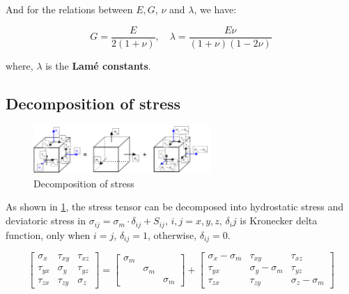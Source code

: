 \documentclass[en,hazy,cyan,8pt,normal]{elegantnote}
\numberwithin{equation}{section}
\begin{document}
    And for the relations between $E, G$, $\nu$ and $\lambda$, we have:

    \begin{equation}\label{eq:063}
      G = \frac{E}{2(1+\nu)}, \quad \lambda = \frac{E\nu}{(1+\nu)(1-2\nu)}
    \end{equation}

    where, $\lambda$ is the \textbf{Lamé constants}.

  \subsection{Decomposition of stress}\label{subsec:03.05}
    
    \begin{figure}[H]
      \centering
      \includegraphics[width=0.6\textwidth]{image/018.png}
      \caption{Decomposition of stress}
      \label{fig:018}
    \end{figure}

    As shown in \cref{fig:018}, the stress tensor can be decomposed into hydrostatic stress and deviatoric stress in $\sigma_{ij} = \sigma_m \cdot \delta_{ij} + S_{ij}$, $i,j =x,y,z$, $\delta_ij$ is Kronecker delta function, only when $i=j$, $\delta_{ij}=1$, otherwise, $\delta_{ij}=0$.

    \begin{equation}\label{eq:065}
      \begin{bmatrix}
        \sigma_x & \tau_{xy} & \tau_{xz} \\
        \tau_{yx} & \sigma_y & \tau_{yz} \\
        \tau_{zx} & \tau_{zy} & \sigma_z
      \end{bmatrix}
      =
      \begin{bmatrix}
        \sigma_m & & \\
        & \sigma_m & \\
        & & \sigma_m
      \end{bmatrix}
      +
      \begin{bmatrix}
        \sigma_x - \sigma_m & \tau_{xy} & \tau_{xz} \\
        \tau_{yx} & \sigma_y - \sigma_m & \tau_{yz} \\
        \tau_{zx} & \tau_{zy} & \sigma_z - \sigma_m
      \end{bmatrix}
    \end{equation}
\end{document}
